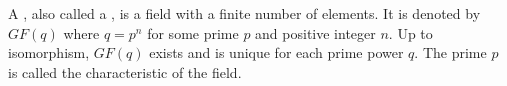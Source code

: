 A , also called a , is a field with a finite number of elements. It is denoted by $GF(q)$ where $q = p^n$ for some prime $p$ and positive integer $n$. Up to isomorphism, $GF(q)$ exists and is unique for each prime power $q$. The prime $p$ is called the characteristic of the field.
